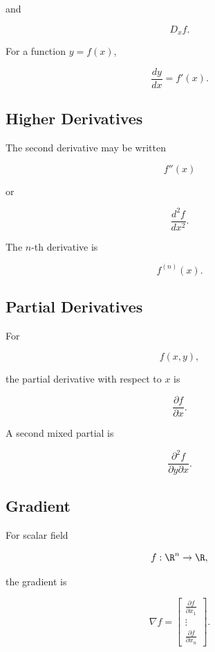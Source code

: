 and

\[
\boxed{
D_xf.
}
\]

For a function \(y=f(x)\),

\[
\boxed{
\frac{dy}{dx}
=
f'(x).
}
\]

\subsection{Higher Derivatives}
\label{subsec:higher-derivative-notation-reference}

The second derivative may be written

\[
\boxed{
f''(x)
}
\]

or

\[
\boxed{
\frac{d^2f}{dx^2}.
}
\]

The \(n\)-th derivative is

\[
\boxed{
f^{(n)}(x).
}
\]

\subsection{Partial Derivatives}
\label{subsec:partial-derivative-notation-reference}

For

\[
f(x,y),
\]

the partial derivative with respect to \(x\) is

\[
\boxed{
\frac{\partial f}{\partial x}.
}
\]

A second mixed partial is

\[
\boxed{
\frac{\partial^2f}
{\partial y\partial x}.
}
\]

\subsection{Gradient}
\label{subsec:gradient-notation-reference}

For scalar field

\[
f:\R^n\to\R,
\]

the gradient is

\[
\boxed{
\nabla f
=
\begin{bmatrix}
\frac{\partial f}{\partial x_1}\\
\vdots\\
\frac{\partial f}{\partial x_n}
\end{bmatrix}.
}
\]

